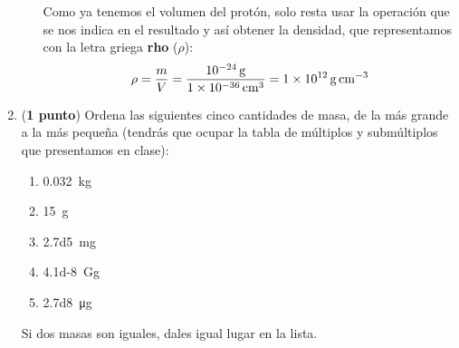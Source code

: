 \documentclass[14pt]{extarticle}
\begin{document}
\begin{enumerate}
\begin{enumerate}
Como ya tenemos el volumen del protón, solo resta usar la operación que se nos indica en el resultado y así obtener la densidad, que representamos con la letra griega \textbf{rho} ($\rho$):
\begin{align*}
\rho = \dfrac{m}{V} = \dfrac{\SI{d-24}{\gram}}{\SI{1d-36}{\cubic\centi\meter}} = \SI{1d12}{\gram\per\cubic\centi\meter}
\end{align*}
\end{enumerate}
\item (\textbf{1 punto}) Ordena las siguientes cinco cantidades de masa, de la más grande a la más pequeña (tendrás que ocupar la tabla de múltiplos y submúltiplos que presentamos en clase):
\begin{enumerate}
\item \SI{0.032}{\kilo\gram}
\item \SI{15}{\gram}
\item \SI{2.7d5}{\milli\gram}
\item \SI{4.1d-8}{\giga\gram}
\item \SI{2.7d8}{\micro\gram}
\end{enumerate}
Si dos masas son iguales, dales igual lugar en la lista.


\end{enumerate}
\end{document}
